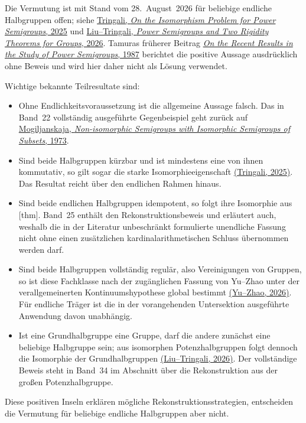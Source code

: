 \documentclass[main.tex]{subfiles}
\begin{document}
\begin{remark}
Die Vermutung ist mit Stand vom 28.~August~2026 für beliebige endliche
Halbgruppen offen; siehe
\href{https://doi.org/10.1007/978-3-031-75326-8_20}%
  {Tringali, \emph{On the Isomorphism Problem for Power Semigroups}, 2025}
und
\href{https://doi.org/10.48550/arXiv.2606.01917}%
  {Liu--Tringali, \emph{Power Semigroups and Two Rigidity Theorems for
  Groups}, 2026}.
Tamuras früherer Beitrag
\href{https://doi.org/10.1007/978-94-009-3839-7_22}%
  {\emph{On the Recent Results in the Study of Power Semigroups}, 1987}
berichtet die positive Aussage ausdrücklich ohne Beweis und wird hier daher
nicht als Lösung verwendet.

Wichtige bekannte Teilresultate sind:
\begin{itemize}
  \item Ohne Endlichkeitsvoraussetzung ist die allgemeine Aussage falsch.
    Das in Band~22 vollständig ausgeführte Gegenbeispiel geht zurück auf
    \href{https://doi.org/10.1007/BF02389140}%
      {Mogiljanskaja, \emph{Non-isomorphic Semigroups with Isomorphic
      Semigroups of Subsets}, 1973}.
  \item Sind beide Halbgruppen kürzbar und ist mindestens eine von ihnen
    kommutativ, so gilt sogar die starke Isomorphieeigenschaft
    \href{https://doi.org/10.1007/978-3-031-75326-8_20}%
      {(Tringali, 2025)}.  Das Resultat reicht über den endlichen Rahmen
      hinaus.
  \item Sind beide endlichen Halbgruppen idempotent, so folgt ihre
    Isomorphie aus
    [thm].
    Band~25 enthält den Rekonstruktionsbeweis und erläutert auch, weshalb
    die in der Literatur unbeschränkt formulierte unendliche Fassung nicht
    ohne einen zusätzlichen kardinalarithmetischen Schluss übernommen
    werden darf.
  \item Sind beide Halbgruppen vollständig regulär, also Vereinigungen von
    Gruppen, so ist diese Fachklasse nach der zugänglichen Fassung von
    Yu--Zhao unter der verallgemeinerten Kontinuumshypothese global bestimmt
    \href{https://doi.org/10.1080/00927872.2026.2659846}%
      {(Yu--Zhao, 2026)}.  Für endliche Träger ist die in der vorangehenden
      Untersektion ausgeführte Anwendung davon unabhängig.
  \item Ist eine Grundhalbgruppe eine Gruppe, darf die andere zunächst eine
    beliebige Halbgruppe sein; aus isomorphen Potenzhalbgruppen folgt
    dennoch die Isomorphie der Grundhalbgruppen
    \href{https://doi.org/10.48550/arXiv.2606.01917}%
      {(Liu--Tringali, 2026)}.  Der vollständige Beweis steht in Band~34 im
      Abschnitt über die Rekonstruktion aus der großen Potenzhalbgruppe.
\end{itemize}
Diese positiven Inseln erklären mögliche Rekonstruktionsstrategien, entscheiden
die Vermutung für beliebige endliche Halbgruppen aber nicht.
\end{remark}
\end{document}
